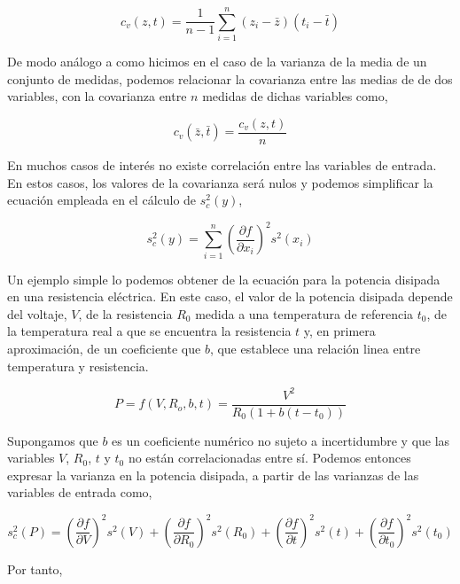\begin{equation*}
c_v(z,t) =\frac{1}{n-1}\sum_{i=1}^n(z_i-\bar{z})(t_i-\bar{t})
\end{equation*}

De modo análogo a como hicimos en el caso de la varianza de la media de un conjunto de medidas, podemos relacionar la covarianza entre las medias de  de dos variables, con la covarianza entre $n$ medidas de dichas variables como,

\begin{equation*}
c_v(\bar{z},\bar{t}) =\frac{c_v(z,t)}{n}
\end{equation*}

En muchos casos de interés no existe correlación entre las variables de entrada. En estos casos, los valores de la covarianza será nulos y podemos simplificar la ecuación empleada en el cálculo de $s_c^2(y)$,

\begin{equation*}
s_c^2(y) = \sum_{i=1}^n\left(\frac{\partial f}{\partial x_i}\right)^2 s^2(x_i)
\end{equation*}


Un ejemplo simple lo podemos obtener de la ecuación para la potencia disipada en una resistencia eléctrica. En este caso, el valor de la potencia disipada depende del voltaje, $V$, de la resistencia $R_0$ medida a una temperatura de referencia $t_0$, de la temperatura real a que se encuentra la resistencia $t$ y, en primera aproximación, de un coeficiente que $b$, que establece una relación linea entre temperatura y resistencia. 

\begin{equation*}
P = f(V,R_o,b,t) = \frac{V^2}{R_0\left(1+b(t-t_0)\right)}
\end{equation*}

Supongamos que $b$ es un coeficiente numérico no sujeto a incertidumbre y que las  variables $V$, $R_0$, $t$ y $t_0$ no están correlacionadas entre sí. Podemos entonces expresar la varianza  en la  potencia disipada, a partir de las varianzas de las variables de entrada como,

\begin{equation*}
s_c^2(P) = \left(\frac{\partial f}{\partial V}\right)^2 s^2(V)+ \left(\frac{\partial f}{\partial R_0}\right)^2 s^2(R_0)+ \left(\frac{\partial f}{\partial t}\right)^2 s^2(t)+\left(\frac{\partial f}{\partial t_0}\right)^2 s^2(t_0)    
\end{equation*}

Por tanto,

